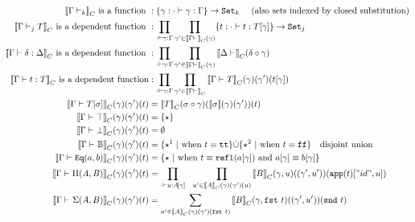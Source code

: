 \begin{align*}
  \denotesC{\goodCtx{\Gm}{k}} \text{ is a function }&: \{\gm : \goodSub{\cdot}{\gm}{\Gm} \} \to \Set{k} \quad \text{ (also sets indexed by closed substitution)}\\
  \denotesC{\goodType{\Gm}{T}{j}} \text{ is a dependent function }&: \prod_{\goodSub{\cdot}{\gm}{\Gm}}\prod_{\gm' \in \denotesC{\goodCtx{\Gm}{}}(\gm)}\{t : \goodTerm{\cdot}{t}{\sub{T}{\gm}}\}\to\Set{j} \\
  \denotesC{\goodSub{\Gm}{\delta}{\Delta}} \text{ is a dependent function }&: \prod_{\goodSub{\cdot}{\gm}{\Gm}} \prod_{\gm' \in \denotesC{\goodCtx{\Gm}{}}(\gm)} \denotesC{\goodCtx{\Dl}{}}(\delta \circ \gm) \\
  \denotesC{\goodTerm{\Gm}{t}{T}} \text{ is a dependent function}&: \prod_{\goodSub{\cdot}{\gm}{\Gm}} \prod_{\gm' \in \denotesC{\goodCtx{\Gm}{}}}\denotesC{\goodType{\Gm}{T}{}}(\gm)(\gm')(\sub{t}{\gm})\\
  \denotesC{\goodType{\Gm}{\sub{T}{\sigma}}{}}(\gm)(\gm')(t) &= \denotesC{T}(\sigma \circ \gm)(\denotes{\sigma}(\gm)(\gm'))(t)\\
  \denotesC{\goodType{\Gm}{\top}{}}(\gm)(\gm')(t) &= \{\star \} \\
  \denotesC{\goodType{\Gm}{\bot}{}}(\gm)(\gm')(t) &= \emptyset \\
  \denotesC{\goodType{\Gm}{\cB}{}}(\gm)(\gm')(t) &= \{\star^1 \ | \text{ when } t \equiv \true  \} \dot{\cup} \{\star^2 \ | \text{ when } t \equiv \false  \} \quad \text{disjoint union} \\
  \denotesC{\goodType{\Gm}{\TyId{a}{b}}{}}(\gm)(\gm')(t) &= \{\star \ |  \text{ when } t \equiv \eqrefl{\sub{a}{\gm}} \text{ and } \sub{a}{\gm} \equiv \sub{b}{\gm} \} \\
  \denotesC{\goodType{\Gm}{\TyPi{A}{B}}{}}(\gm)(\gm')(t) &= \prod_{\goodTerm{\cdot}{u}{\sub{A}{\gm}}} \ \ \prod_{u' \in \denotesC{A}(\gm)(\gm')(u)} \denotesC{B}(\SubstExt{\gm}{u})((\gm', u'))(\sub{\app{t}}{\SubstExt{"id"}{u}})\\
  \denotesC{\goodType{\Gm}{\TySigma{A}{B}}{}}(\gm)(\gm')(t) &= \sum_{u' \in \denotesC{A}(\gm)(\gm')(\fst{t})} \denotesC{B}(\SubstExt{\gm}{\fst{t}})((\gm', u'))(\snd{t}) \\

\end{align*}
